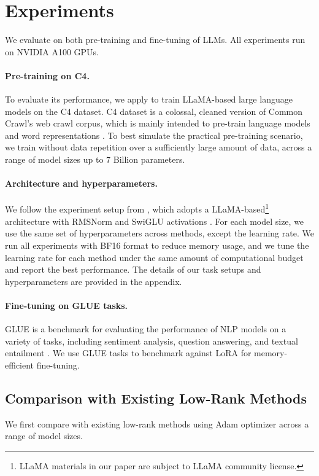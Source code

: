 \section{Experiments}

We evaluate \lowrank{} on both pre-training and fine-tuning of LLMs. All experiments run on NVIDIA A100 GPUs.\vspace{-2mm}


\paragraph{Pre-training on C4.}
To evaluate its performance, we apply \lowrank{} to train LLaMA-based large language models on the C4 dataset. 
C4 dataset is a colossal, cleaned version of Common Crawl's web crawl corpus, which is mainly intended to pre-train language models and word representations \citep{raffelExploringLimitsTransfer2023}.
To best simulate the practical pre-training scenario, we train without data repetition over a sufficiently large amount of data, across a range of model sizes up to 7 Billion parameters.
\paragraph{Architecture and hyperparameters.}
We follow the experiment setup from \citet{lialinReLoRAHighRankTraining2023}, which adopts a LLaMA-based\footnote[3]{LLaMA materials in our paper are subject to LLaMA community license.} architecture with RMSNorm and SwiGLU activations \citep{zhangRootMeanSquare2019,shazeerGLUVariantsImprove2020,touvronLlamaOpenFoundation2023}. 
For each model size, we use the same set of hyperparameters across methods, except the learning rate.
We run all experiments with BF16 format to reduce memory usage, and we tune the learning rate for each method under the same amount of computational budget and report the best performance.
The details of our task setups and hyperparameters are provided in the appendix.
\paragraph{Fine-tuning on GLUE tasks.}
GLUE is a benchmark for evaluating the performance of NLP models on a variety of tasks, including sentiment analysis, question answering, and textual entailment \citep{wangGLUEMultiTaskBenchmark2019}.
We use GLUE tasks to benchmark \lowrank{} against LoRA for memory-efficient fine-tuning.
 

\subsection{Comparison with Existing Low-Rank Methods}


We first compare \lowrank{} with existing low-rank methods using Adam optimizer across a range of model sizes.

